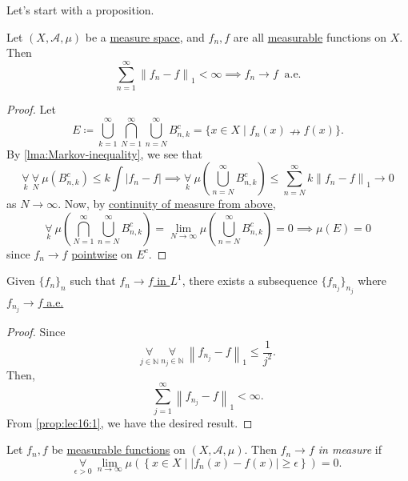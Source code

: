 Let's start with a proposition.

\begin{proposition}\label{prop:lec16:1}
	Let \((X, \mathcal{A} , \mu )\) be a \hyperref[def:measure-space]{measure space}, and \(f_{n}, f\) are all \hyperref[def:measurable-function]{measurable} functions on \(X\). Then
	\[
		\sum_{n=1}^{\infty} \left\lVert f_{n} - f\right\rVert _1 < \infty \implies \hyperref[def:converge-almost-everywhere]{f_{n}\to f\ \text{ a.e.}}
	\]
\end{proposition}
\begin{proof}
	Let
	\[
		E \coloneqq \bigcup_{k=1}^{\infty} \bigcap_{N=1}^{\infty} \bigcup_{n=N}^{\infty} B_{n, k}^{c} = \{x\in X \mid f_{n}(x)\nrightarrow f(x)\}.
	\]
	By \autoref{lma:Markov-inequality}, we see that
	\[
		\underset{k}{\forall }\ \underset{N}{\forall }\ \mu \left(B_{n, k}^{c} \right) \leq k \int \left\vert f_{n} - f \right\vert \implies \underset{k}{\forall }\ \mu \left(\bigcup_{n=N}^{\infty} B_{n, k}^{c} \right)\leq \sum_{n=N}^{\infty} k\left\lVert f_{n} - f\right\rVert _1 \to 0
	\]
	as \(N\to \infty \). Now, by \hyperref[thm:measure-space-continuity-from-above]{continuity of measure from above},
	\[
		\underset{k}{\forall }\ \mu \left(\bigcap_{N=1}^{\infty} \bigcup_{n=N}^{\infty} B_{n, k}^{c} \right)= \lim_{N \to \infty} \mu \left(\bigcup_{n=N}^{\infty} B_{n, k}^{c} \right) = 0 \implies \mu (E) = 0
	\]
	since \(f_{n}\to f\) \hyperref[def:pointwise-convergence]{pointwise} on \(E^{c} \).
\end{proof}

\begin{corollary}
	Given \(\{f_{n}\}_n\) such that \hyperref[def:converge-in-L-1]{\(f_{n}\to f\) in \(L^1\)}, there exists a subsequence \(\{f_{n_{j}}\}_{n_{j}}\) where \hyperref[def:converge-almost-everywhere]{\(f_{n_{j}}\to f\) a.e.}
\end{corollary}
\begin{proof}
	Since
	\[
		\underset{j\in \mathbb{N} }{\forall }\ \underset{n_{j}\in \mathbb{N} }{\forall }\ \left\lVert f_{n_{j}} - f\right\rVert _1 \leq \frac{1}{j^{2} }.
	\]
	Then,
	\[
		\sum_{j=1}^{\infty} \left\lVert f_{n_{j}} - f\right\rVert _1 < \infty.
	\]
	From \autoref{prop:lec16:1}, we have the desired result.
\end{proof}

\begin{definition}\label{def:converge-in-measure}
	Let \(f_{n}, f\) be \hyperref[def:measurable-function]{measurable functions} on \((X, \mathcal{A} , \mu )\). Then \emph{\(f_{n}\to f\) in measure} if
	\[
		\underset{\epsilon >0}{\forall }\ \lim_{n \to \infty} \mu \left(\left\{x\in X \mid \left\vert f_{n}(x) - f(x) \right\vert \geq \epsilon \right\}\right) = 0.
	\]
\end{definition}

